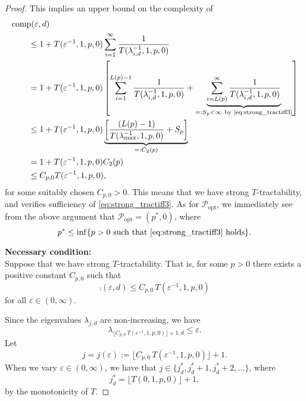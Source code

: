 \documentclass[11pt,a4paper]{article}
\begin{document}
{\begin{proof}
This implies an upper bound on the complexity of
\begin{align*}
       \MoveEqLeft{\comp(\varepsilon,d)} \\
       &\le 1 + T(\varepsilon^{-1},1,p,0) \sum_{i=1}^\infty \frac{1}{T(\lambda_{i, d}^{-1},1,p,0)} \\
       & = 1 + T(\varepsilon^{-1},1, p,0) \left [ \sum_{i=1}^{L(p)-1} \frac{1}{T(\lambda_{i, d}^{-1},1,p,0)}
       + \underbrace{\sum_{i=L(p)}^\infty \frac{1}{T(\lambda_{i, d}^{-1},1,p,0)}}_{=:S_p <\infty\ \text{by \eqref{eq:strong_tractiff3}} }\right] \\
       & \le 1+ T(\varepsilon^{-1},1,p,0) \underbrace{\left[\frac{(L(p)-1)}{T(\lambda_{\max}^{-1},1,p,0)} + S_p\right]}_{=:C_2(p)}\\
       & = 1+ T(\varepsilon^{-1},1,p,0) C_2 (p)\\
       &\le C_{p,0} T(\varepsilon^{-1},1,p,0),
\end{align*}
for some suitably chosen $C_{p,0}>0$. This means that we have strong $T$-tractability, and verifies sufficiency of \eqref{eq:strong_tractiff3}. 
As for $\mathcal{P}_{\text{opt}}$, we immediately see from the above argument that $\mathcal{P}_{\text{opt}}=(p^*,0)$, where
\[
 p^* \le \inf\{p>0\ \mbox{such that \eqref{eq:strong_tractiff3} holds}\}.
\]


\bigskip
\noindent \textbf{Necessary condition:} \\
Suppose that we have strong 
$T$-tractability. That is, for some $p>0$ there exists a positive constant $C_{p,0}$ such that
\[
\comp(\varepsilon,d)\le C_{p,0}\, T(\varepsilon^{-1},1,p,0)
\]
for all $\varepsilon\in (0,\infty)$.


% 

Since the eigenvalues $\lambda_{j,d}$ are non-increasing, we have
\begin{equation}\label{eq:lambda_K_strong3}
\lambda_{\lfloor C_{p,0}\, T(\varepsilon^{-1},1,p,0)\rfloor +1,d}\le \varepsilon.
\end{equation}
Let
\[
j=j (\varepsilon):= \lfloor C_{p,0}\, T(\varepsilon^{-1},1,p,0)\rfloor +1.
\]
When we vary $\varepsilon\in (0,\infty)$, we have that $j\in \{j_d^*, j_d^*+1, j_d^*+2,\ldots\}$, where 
\[
  j_d^*=\lfloor  T(0,1,p,0)\rfloor +1,
\]
by the monotonicity of $T$.


\end{proof}}
\end{document}
